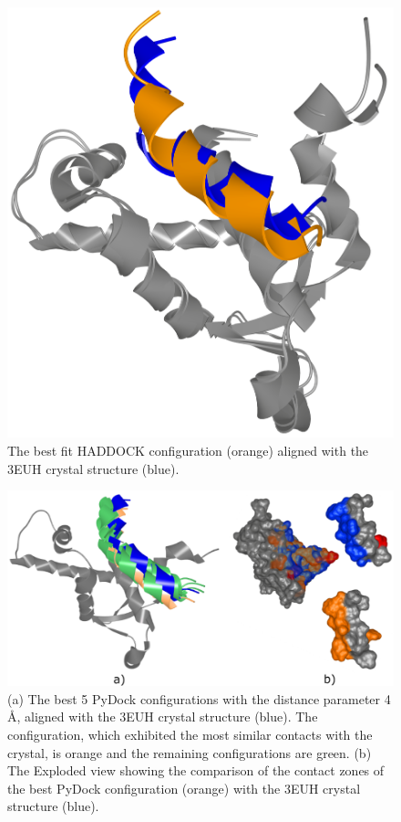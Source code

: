 \documentclass{bmcart}
\def\ExpView {Exploded view\xspace}
\begin{document}
\begin{backmatter}
\begin{figure}[h!]
  \centering
  \includegraphics[width=0.9\columnwidth]{images/figure17.png}
  \caption{ The best fit HADDOCK configuration (orange) aligned with the 3EUH crystal structure (blue).}
  \label{fig:MukEF_selection_3_best_pair}
\end{figure}

\begin{figure}[h!]
    \centering 
    \includegraphics[width=0.9\columnwidth]{images/figure18.pdf}
    \caption{(a) The best 5 PyDock configurations with the distance parameter 4 \AA,  aligned with the 3EUH crystal structure (blue). The configuration, which exhibited the most similar contacts with the crystal, is orange and the remaining configurations are green. (b) The \ExpView showing the comparison of the contact zones of the best PyDock configuration (orange) with the 3EUH crystal structure (blue).}
  \label{fig:pydock_pocket_string}
\end{figure}




\end{backmatter}
\end{document}
